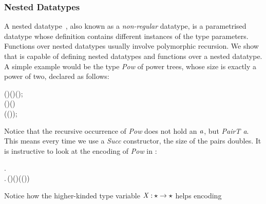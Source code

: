 \subsubsection{Nested Datatypes}

A nested datatype~\cite{nesteddt},
also known as a \emph{non-regular} datatype, is a parametrised
datatype whose definition contains different instances of the type
parameters. Functions over nested datatypes usually involve
polymorphic recursion. We show that \sufcc is capable of defining 
nested datatypes and functions over a nested datatype. A simple example would be the
type \emph{Pow} of power trees, whose size is exactly a power of two,
declared as follows:
\begin{hscode}\SaveRestoreHook
{}%
%
%
%
\>[3]{}\;\;(\mathbin{:}\star)\mathrel{=}\;(\mathbin{:})\;(\mathbin{:});{}\<[E]%
\\
\>[3]{}\;\;(\mathbin{:}\star)\mathrel{=}\;(\mathbin{:}){}\<[E]%
\\
\>[3]{}\<[5]%
\>[5]{}\mid {}\;(\mathbin{:}\;(\;));{}\<[E]%
\ColumnHook
\end{hscode}\resethooks
Notice that the recursive occurrence of \emph{Pow} does not hold
an \ensuremath{\Varid{a}}, but \emph{PairT a}.
This means every time we use a
\emph{Succ} constructor, the size of the pairs doubles. It is instructive to
look at the encoding of \emph{Pow} in \name:
\begin{hscode}\SaveRestoreHook
{}%
%
%
%
\>[3]{}\;\mathbin{:}\star\to \star\mathrel{=}\;\mathbin{:}\star\to \star.\,{}\<[E]%
\\
\>[3]{}\<[7]%
\>[7]{}\lambda {}\mathbin{:}\star.\,(\mathbin{:}\star)\to (\to {})\to (\;(\;)\to {})\to {}\<[E]%
\ColumnHook
\end{hscode}\resethooks
Notice how the higher-kinded type variable \ensuremath{\Conid{X}\mathbin{:}\star\to \star} helps encoding
